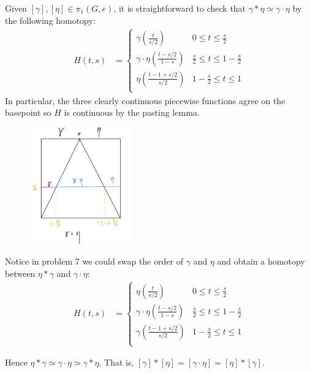 \documentclass[12pt]{article}
\begin{document}
\begin{problem}[7]
	Given $ [\gamma], [\eta] \in \pi_1( G,e)$, it is straightforward to check that $ \gamma * \eta \simeq \gamma \cdot \eta$ by the following homotopy:
	\begin{align*}
		H(t,s) &= \begin{cases}
			\gamma \left( \frac{t}{s /2} \right) & 0 \leq t \leq \frac{s}{2} \\
			\gamma \cdot \eta \left( \frac{t- s /2}{ 1-s} \right) & \frac{s}{2} \leq t \leq 1- \frac{s}{2}\\
			\eta \left( \frac{t -1 + s /2}{ s /2} \right) & 1- \frac{s}{2} \leq t \leq 1\\
		\end{cases} 
	\end{align*}
In particular, the three clearly continuous piecewise functions agree on the basepoint so $ H$ is continuous by the pasting lemma.
~\begin{figure}[H]
	\centering
	\includegraphics[width=0.4\textwidth]{./figures/abelian.png}
\end{figure}
\end{problem}
\begin{problem}[8]
Notice in problem 7 we could swap the order of $ \gamma$ and $ \eta$ and obtain a homotopy between $ \eta* \gamma$ and $ \gamma \cdot \eta$: 
	\begin{align*}
		H(t,s) &= \begin{cases}
			\eta \left( \frac{t}{s /2} \right) & 0 \leq t \leq \frac{s}{2} \\
			\gamma \cdot \eta \left( \frac{t- s /2}{ 1-s} \right) & \frac{s}{2} \leq t \leq 1- \frac{s}{2}\\
			\gamma \left( \frac{t -1 + s /2}{ s /2} \right) & 1- \frac{s}{2} \leq t \leq 1\\
		\end{cases} 
	\end{align*}

	Hence $\eta * \gamma \simeq \gamma \cdot \eta \simeq \gamma * \eta$. That is, $ [ \gamma] * [\eta] = [ \gamma \cdot \eta] = [\eta] * [ \gamma]$.

\end{problem}
\end{document}
